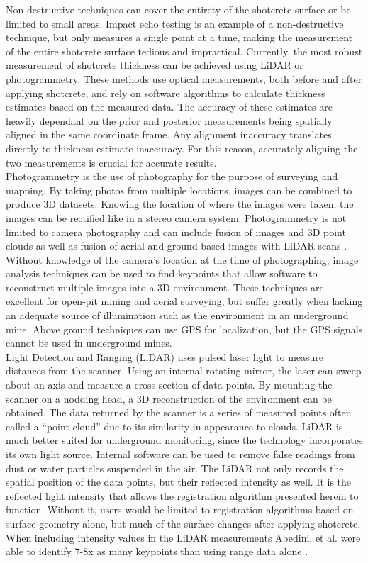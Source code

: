 Non-destructive techniques can cover the entirety of the shotcrete surface or be limited to small areas. Impact echo testing is an example of a non-destructive technique\cite{impact}, but only measures a single point at a time, making the measurement of the entire shotcrete surface tedious and impractical. Currently, the most robust measurement of shotcrete thickness can be achieved using LiDAR or photogrammetry. These methods use optical measurements, both before and after applying shotcrete, and rely on software algorithms to calculate thickness estimates based on the measured data. The accuracy of these estimates are heavily dependant on the prior and posterior measurements being spatially aligned in the same coordinate frame. Any alignment inaccuracy translates directly to thickness estimate inaccuracy. For this reason, accurately aligning the two measurements is crucial for accurate results.\\

Photogrammetry is the use of photography for the purpose of surveying and mapping. By taking photos from multiple locations, images can be combined to produce 3D datasets. Knowing the location of where the images were taken, the images can be rectified like in a stereo camera system. Photogrammetry is not limited to camera photography and can include fusion of images and 3D point clouds \cite{photo1} as well as fusion of aerial and ground based images with LiDAR scans \cite{photo2}. Without knowledge of the camera's location at the time of photographing, image analysis techniques can be used to find keypoints that allow software to reconstruct multiple images into a 3D environment. These techniques are excellent for open-pit mining and aerial surveying, but suffer greatly when lacking an adequate source of illumination such as the environment in an underground mine. Above ground techniques can use GPS for localization, but the GPS signals cannot be used in underground mines.\\

Light Detection and Ranging (LiDAR) uses pulsed laser light to measure distances from the scanner. Using an internal rotating mirror, the laser can sweep about an axis and measure a cross section of data points. By mounting the scanner on a nodding head, a 3D reconstruction of the environment can be obtained. The data returned by the scanner is a series of measured points often called a ``point cloud'' due to its similarity in appearance to clouds. LiDAR is much better suited for underground monitoring, since the technology incorporates its own light source. Internal software can be used to remove false readings from dust or water particles suspended in the air. The LiDAR not only records the spatial position of the data points, but their reflected intensity as well. It is the reflected light intensity that allows the registration algorithm presented herein to function. Without it, users would be limited to registration algorithms based on surface geometry alone, but much of the surface changes after applying shotcrete. When including intensity values in the LiDAR measurements Abedini, et al. were able to identify 7-8x as many keypoints than using range data alone \cite{reg1}.\\

